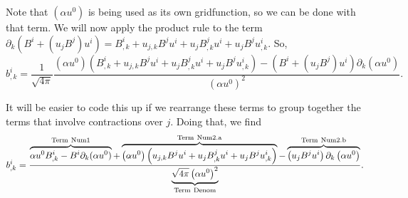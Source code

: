 \documentclass[landscape,letterpaper,10pt,english]{article}
\begin{document}
Note that \(\left( \alpha u^0 \right)\) is being used as its own
gridfunction, so we can be done with that term. We will now apply the
product rule to the term
\(\partial_k \left(B^i + (u_j B^j) u^i\right) = B^i_{,k} + u_{j,k} B^j u^i + u_j B^j_{,k} u^i + u_j B^j u^i_{,k}\).
So,
\[ b^i_{,k} = \frac{1}{\sqrt{4 \pi}} \frac{\left(\alpha u^0\right)  \left(B^i_{,k} + u_{j,k} B^j u^i + u_j B^j_{,k} u^i + u_j B^j u^i_{,k}\right) - \left(B^i + (u_j B^j) u^i\right) \partial_k \left(\alpha u^0\right)}{\left(\alpha u^0\right)^2}. \]

It will be easier to code this up if we rearrange these terms to group
together the terms that involve contractions over \(j\). Doing that, we
find \[
b^i_{,k} = \frac{\overbrace{\alpha u^0 B^i_{,k} - B^i \partial_k (\alpha u^0)}^{\rm Term\ Num1} + \overbrace{\left( \alpha u^0 \right) \left( u_{j,k} B^j u^i + u_j B^j_{,k} u^i + u_j B^j u^i_{,k} \right)}^{\rm Term\ Num2.a} - \overbrace{\left( u_j B^j u^i \right) \partial_k \left( \alpha u^0 \right) }^{\rm Term\ Num2.b}}{\underbrace{\sqrt{4 \pi} \left( \alpha u^0 \right)^2}_{\rm Term\ Denom}}.
\]
\end{document}
